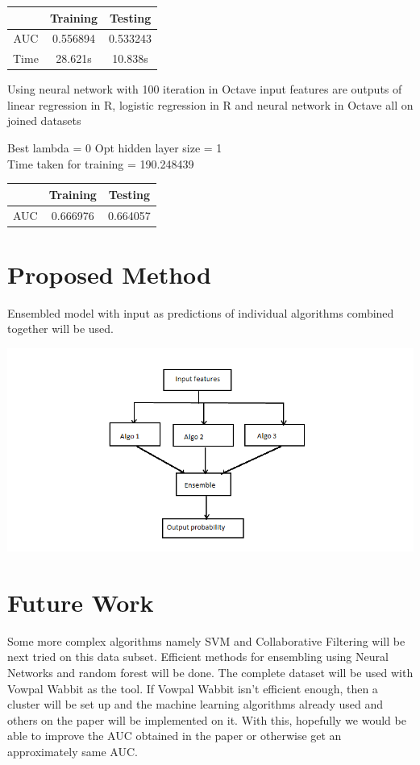 \documentclass[10pt]{article}
\begin{document}
\begin{center}
 \begin{tabular}{|c | c | c||} 
 \hline
 & Training & Testing\\ [0.5ex] 
 \hline\hline
AUC & 0.556894 & 0.533243\\ 
 \hline
Time & 28.621s & 10.838s\\ 
 \hline
\end{tabular}
\end{center}

Using neural network with 100 iteration in Octave
input features are outputs of linear regression in R, logistic regression in R and neural network in Octave all on joined datasets

	Best lambda = 0 Opt hidden layer size = 1 
\\
	Time taken for training = 190.248439
\\
\begin{center}
 \begin{tabular}{|c | c | c ||} 
 \hline
 & Training & Testing\\ [0.5ex] 
 \hline\hline
AUC & 0.666976 & 0.664057\\
 \hline
\end{tabular}
\end{center}

\section{Proposed Method}
Ensembled model with input as predictions of individual algorithms combined together will be used. 
\begin{center}
\includegraphics[scale=0.5]{flowchart}
\end{center}
\section{Future Work}
Some more complex algorithms namely SVM and Collaborative Filtering will be next tried on this data subset. Efficient methods for ensembling using Neural Networks and random forest will be done. The complete dataset will be used with Vowpal Wabbit as the tool. If Vowpal Wabbit isn't efficient enough, then a cluster will be set up and the machine learning algorithms already used and others on the paper will be implemented on it. With this, hopefully we would be able to improve the AUC obtained in the paper or otherwise get an approximately same AUC.
\end{document}
